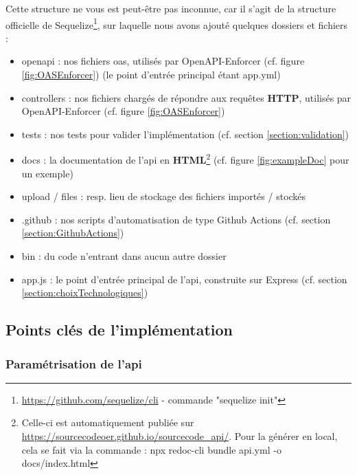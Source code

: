 Cette structure ne vous est peut-être pas inconnue, car il s'agit de la structure officielle de Sequelize\footnote{
    \url{https://github.com/sequelize/cli} - commande "sequelize init"
}, sur laquelle nous avons ajouté quelques dossiers et fichiers :

\begin{itemize}[nosep,noitemsep,topsep=0pt,partopsep=0pt,after=\vspace*{2pt}]
    \item openapi : nos fichiers \Gls{oas}, utilisés par OpenAPI-Enforcer (cf. figure \ref{fig:OASEnforcer}) (le point d'entrée principal étant app.yml)
    \item controllers : nos fichiers chargés de répondre aux requêtes \textbf{HTTP}, utilisés par OpenAPI-Enforcer (cf. figure \ref{fig:OASEnforcer})
    \item tests : nos tests pour valider l'implémentation (cf. section \ref{section:validation})
    \item docs : la documentation de l'\Gls{api} en \textbf{HTML}\footnote{
        Celle-ci est automatiquement publiée sur 
        \href{https://sourcecodeoer.github.io/sourcecode\_api/}{https://sourcecodeoer.github.io/sourcecode\_api/}.
        Pour la générer en local, cela se fait via la commande : 
        npx redoc-cli bundle api.yml -o docs/index.html 
    } (cf. figure \ref{fig:exampleDoc} pour un exemple)
    \item upload / files : resp. lieu de stockage des fichiers importés / stockés 
    \item .github : nos scripts d'automatisation de type Github Actions (cf. section \ref{section:GithubActions}) 
    \item bin : du code n'entrant dans aucun autre dossier
    \item app.js : le point d'entrée principal de l'\Gls{api}, construite sur Express (cf. section \ref{section:choixTechnologiques})
\end{itemize}

\pagebreak
\subsection{Points clés de l'implémentation}

\subsubsection{Paramétrisation de l'\Gls{api}}
\label{section:apiConfig}

